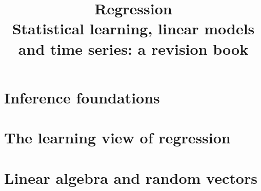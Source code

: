\documentclass[11pt,oneside]{book}
\title{Regression\\[0.3em]\large Statistical learning, linear models and time series: a revision book}
\author{}
\date{}
\begin{document}
\frontmatter
\maketitle
\tableofcontents


\mainmatter
\part{Inference foundations}




\part{The learning view of regression}


\part{Linear algebra and random vectors}



\backmatter
\printindex
\end{document}
